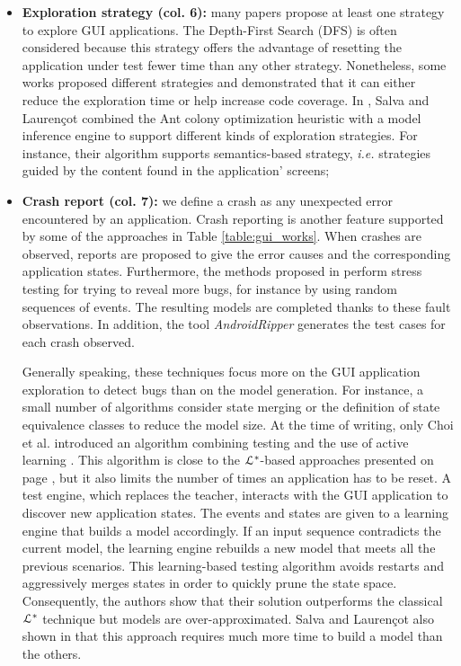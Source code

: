 \begin{itemize}
	\item \textbf{Exploration strategy (col. 6):} many
	papers propose at least one strategy to explore GUI
	applications. The Depth-First Search (DFS) is often
	considered because this strategy offers the advantage of
	resetting the application under test fewer time than any other
	strategy. Nonetheless, some works proposed different strategies
	\cite{Amalfitano:2012:UGR:2351676.2351717,5954416,crawljax:tweb12,WPX13}
	and demonstrated that it can either reduce the exploration
    time or help increase code coverage. In \cite{SP15}, Salva
	and Laurençot combined the Ant colony optimization heuristic
	with a model inference engine to support different kinds of
	exploration strategies. For instance, their algorithm
	supports semantics-based strategy, \emph{i.e.} strategies guided by
	the content found in the application' screens;

	\item \textbf{Crash report (col. 7):} we define a crash as
	any unexpected error encountered by an application.  Crash
	reporting is another feature supported by some of the
	approaches in Table \ref{table:gui_works}.  When crashes
	are observed, reports are proposed to give the error causes
	and the corresponding application states. Furthermore, the
	methods proposed in
	\cite{MobiGUITARIEEESoftware2014,guitar,SP15} perform stress
	testing for trying to reveal more bugs,  for instance by
	using random sequences of events. The resulting models are
	completed thanks to these fault observations. In addition,
	the tool \textit{AndroidRipper}
	\cite{Amalfitano:2012:UGR:2351676.2351717} generates the test
	cases for each crash observed.

	Generally speaking, these techniques focus more on the GUI
	application exploration to detect bugs than on the model
	generation. For instance, a small number of algorithms consider state
	merging or the definition of state equivalence classes to
	reduce the model size. At the time of writing, only Choi et
	al. introduced an algorithm combining testing and the use
	of active learning \cite{Choi2013}. This algorithm is close
    to the $\EuScript{L}^*$-based approaches presented on page
	\pageref{sec:active-letoile}, but it also limits the number of
	times an application has to be reset. A test engine, which
	replaces the teacher, interacts with the GUI application to
	discover new application states. The events and states are
	given to a learning engine that builds a model accordingly.
	If an input sequence contradicts the current model, the
	learning engine rebuilds a new model that meets all the
	previous scenarios.  This learning-based testing algorithm
	avoids restarts and aggressively merges states in order to
	quickly prune the state space. Consequently, the authors show
	that their solution outperforms the classical
	$\EuScript{L}^*$ technique but models are over-approximated.
	Salva and Laurençot also shown in \cite{SP15} that this
	approach requires much more time to build a model than the
	others.
\end{itemize}


